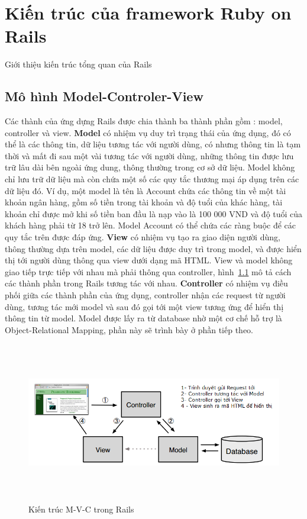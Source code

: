 \chapter{Kiến trúc của framework Ruby on Rails}
Giới thiệu kiến trúc tổng quan của Rails
\section{Mô hình Model-Controler-View}
Các thành của ứng dựng Rails được chia thành ba thành phần gồm : model, controller và view.
\newline
{\bf Model} có nhiệm vụ duy trì trạng thái của ứng dụng, đó có thể là các thông tin, dữ liệu tương tác với người dùng, có nhưng thông tin là tạm thời và mất đi sau một vài tương tác với người dùng, những thông tin được lưu trữ lâu dài bên ngoài ứng dung, thông thường trong cơ sở dữ liệu.
\newline
Model không chỉ lưu trữ dữ liệu mà còn chứa một số các quy tắc thương mại áp dụng trên các dữ liệu đó.
Ví dụ, một model là tên là Account chứa các thông tin về một tài khoản ngân hàng, gồm số tiền trong tài khoản và độ tuổi của khác hàng, tài khoản chỉ được mở khi số tiền ban đầu là nạp vào là 100 000 VND và độ tuổi của khách hàng phải từ 18 trở lên. Model Account có thể chứa các ràng buộc để các quy tắc trên được đáp ứng.
\newline
{\bf View} có nhiệm vụ tạo ra giao diện người dùng, thông thường dựa trên model, các dữ liệu được duy trì trong model, và được hiển thị tới người dùng thông qua view dưới dạng mã HTML. View và model không giao tiếp trực tiếp với nhau mà phải thông qua controller, hình~\ref{fig:rails} mô tả cách các thành phần trong Rails tương tác với nhau.
\newline
{\bf Controller} có nhiệm vụ điều phối giữa các thành phần của ứng dụng, controller nhận các request từ người dùng, tương tác mới model và sau đó gọi tới một view tương ứng để hiển thị thông tin từ model. Model được lấy ra từ database nhờ một cơ chế hỗ trợ là Object-Relational Mapping, phần này sẽ trình bày ở phần tiếp theo.
\newline
\begin{figure}
	\centering
		\includegraphics[width=15cm, height=7cm]{image/rails.png}
	\caption{Kiến trúc M-V-C trong  Rails}
	\label{fig:rails}
\end{figure}


